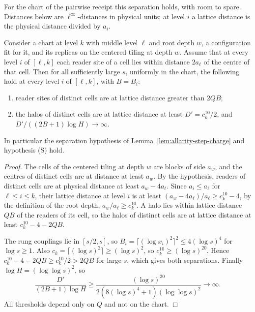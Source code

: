 For the chart of the pairwise receipt this separation holds, with room to
spare. Distances below are $\ell^\infty$-distances in physical units;
at level $i$ a lattice distance is the physical distance divided by
$a_i$.

\begin{lemma}
\label{lem:allarity-halo-separation}
Consider a chart at level $k$ with middle level $\ell$ and root depth $w$,
a configuration fit for it, and its replicas on the centered tiling at
depth $w$. Assume that at every level $i$ of $[\ell,k]$ each reader site
of a cell lies within distance $2a_\ell$ of the centre of that cell. Then
for all sufficiently large $s$, uniformly in the chart, the following
hold at every level $i$ of $[\ell,k]$, with $B=B_i$:
\begin{enumerate}
\item reader sites of distinct cells are at lattice distance greater than
 $2QB$;
\item the halos of distinct cells are at lattice distance at least
 $D'=c_k^{10}/2$, and $D'/((2B+1)\log H)\to\infty$.
\end{enumerate}
In particular the separation hypothesis of
Lemma~\ref{lem:allarity-step-charge} and hypothesis (S) hold.
\end{lemma}
\begin{proof}
The cells of the centered tiling at depth $w$ are blocks of side $a_w$, and
the centres of distinct cells are at distance at least $a_w$. By the
hypothesis, readers of distinct cells are at physical distance at least
$a_w-4a_\ell$. Since $a_i\le a_\ell$ for $\ell\le i\le k$, their lattice
distance at level $i$ is at least $(a_w-4a_\ell)/a_\ell\ge c_k^{10}-4$, by
the definition of the root depth, $a_w/a_\ell\ge c_k^{10}$. A halo lies
within lattice distance $QB$ of the readers of its cell, so the halos of
distinct cells are at lattice distance at least $c_k^{10}-4-2QB$.

The rung couplings lie in $[s/2,s]$, so $B_i=\lceil(\log x_i)^2\rceil^2\le
4(\log s)^4$ for $\log s\ge1$. Also $c_k=\lceil(\log s)^2\rceil\ge(\log s)^2$,
so $c_k^{10}\ge(\log s)^{20}$. Hence $c_k^{10}-4-2QB\ge c_k^{10}/2>2QB$ for
large $s$, which gives both separations. Finally
$\log H=(\log\log s)^2$, so
\[
 \frac{D'}{(2B+1)\log H}\ge\frac{(\log s)^{20}}
        {2(8(\log s)^4+1)(\log\log s)^2}\longrightarrow\infty .
\]
All thresholds depend only on $Q$ and not on the chart.
\end{proof}

